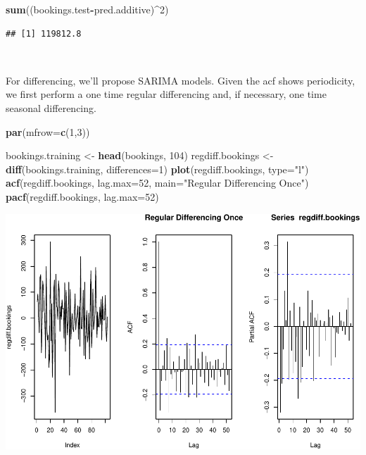 \documentclass[]{article}
\newenvironment{Shaded}{\begin{snugshade}}{\end{snugshade}}
\newcommand{\DataTypeTok}[1]{\textcolor[rgb]{0.13,0.29,0.53}{#1}}
\newcommand{\DecValTok}[1]{\textcolor[rgb]{0.00,0.00,0.81}{#1}}
\newcommand{\KeywordTok}[1]{\textcolor[rgb]{0.13,0.29,0.53}{\textbf{#1}}}
\newcommand{\NormalTok}[1]{#1}
\newcommand{\OperatorTok}[1]{\textcolor[rgb]{0.81,0.36,0.00}{\textbf{#1}}}
\newcommand{\StringTok}[1]{\textcolor[rgb]{0.31,0.60,0.02}{#1}}
\begin{document}
\begin{Shaded}
\begin{Highlighting}[]
\KeywordTok{sum}\NormalTok{((bookings.test}\OperatorTok{-}\NormalTok{pred.additive)}\OperatorTok{^}\DecValTok{2}\NormalTok{)}
\end{Highlighting}
\end{Shaded}

\begin{verbatim}
## [1] 119812.8
\end{verbatim}

\(\;\)

For differencing, we'll propose SARIMA models. Given the acf shows
periodicity, we first perform a one time regular differencing and, if
necessary, one time seasonal differencing.

\begin{Shaded}
\begin{Highlighting}[]
\KeywordTok{par}\NormalTok{(}\DataTypeTok{mfrow=}\KeywordTok{c}\NormalTok{(}\DecValTok{1}\NormalTok{,}\DecValTok{3}\NormalTok{))}

\NormalTok{bookings.training <-}\StringTok{ }\KeywordTok{head}\NormalTok{(bookings, }\DecValTok{104}\NormalTok{)}
\NormalTok{regdiff.bookings <-}\StringTok{ }\KeywordTok{diff}\NormalTok{(bookings.training, }\DataTypeTok{differences=}\DecValTok{1}\NormalTok{)}
\KeywordTok{plot}\NormalTok{(regdiff.bookings, }\DataTypeTok{type=}\StringTok{"l"}\NormalTok{)}
\KeywordTok{acf}\NormalTok{(regdiff.bookings, }\DataTypeTok{lag.max=}\DecValTok{52}\NormalTok{, }\DataTypeTok{main=}\StringTok{"Regular Differencing Once"}\NormalTok{)}
\KeywordTok{pacf}\NormalTok{(regdiff.bookings, }\DataTypeTok{lag.max=}\DecValTok{52}\NormalTok{)}
\end{Highlighting}
\end{Shaded}

\begin{center}\includegraphics{bookings_forecast_files/figure-latex/unnamed-chunk-8-1} \end{center}
\end{document}
